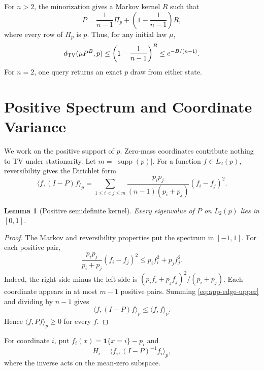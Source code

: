 \documentclass{article}
\newtheorem{lemma}[theorem]{Lemma}
\newcommand{\one}{\mathbf 1}
\newcommand{\TV}{d_{\rm TV}}
\newcommand{\supp}{\operatorname{supp}}
\newcommand{\ip}[2]{\langle #1,#2\rangle}
\begin{document}
For $n>2$, the minorization gives a Markov kernel $R$ such that
\begin{equation}
 P=\frac1{n-1}\Pi_p+\left(1-\frac1{n-1}\right)R,
 \label{eq:app-doeblin}
\end{equation}
where every row of $\Pi_p$ is $p$. Thus, for any initial law $\mu$,
\begin{equation}
 \TV(\mu P^B,p)
 \le\left(1-\frac1{n-1}\right)^B
 \le e^{-B/(n-1)}.
 \label{eq:app-mixing}
\end{equation}
For $n=2$, one query returns an exact $p$ draw from either state.

\section{Positive Spectrum and Coordinate Variance}
\label{app:variance}

We work on the positive support of $p$. Zero-mass coordinates contribute
nothing to TV under stationarity. Let $m=|\supp(p)|$. For a function
$f\in L_2(p)$, reversibility gives the Dirichlet form
\begin{equation}
 \ip{f}{(I-P)f}_p
 =\sum_{1\le i<j\le m}
 \frac{p_ip_j}{(n-1)(p_i+p_j)}(f_i-f_j)^2.
 \label{eq:app-dirichlet}
\end{equation}

\begin{lemma}[Positive semidefinite kernel]
\label{lem:app-psd}
Every eigenvalue of $P$ on $L_2(p)$ lies in $[0,1]$.
\end{lemma}

\begin{proof}
The Markov and reversibility properties put the spectrum in $[-1,1]$. For
each positive pair,
\begin{equation}
 \frac{p_ip_j}{p_i+p_j}(f_i-f_j)^2
 \le p_if_i^2+p_jf_j^2.
 \label{eq:app-edge-upper}
\end{equation}
Indeed, the right side minus the left side is
$(p_if_i+p_jf_j)^2/(p_i+p_j)$. Each coordinate appears in at most $m-1$
positive pairs. Summing \eqref{eq:app-edge-upper} and dividing by $n-1$
gives
\[
 \ip{f}{(I-P)f}_p\le\ip{f}{f}_p.
\]
Hence $\ip{f}{Pf}_p\ge0$ for every $f$.
\end{proof}

For coordinate $i$, put $f_i(x)=\one\{x=i\}-p_i$ and
\begin{equation}
 H_i=\ip{f_i}{(I-P)^{-1}f_i}_p,
 \label{eq:app-green}
\end{equation}
where the inverse acts on the mean-zero subspace.
\end{document}
